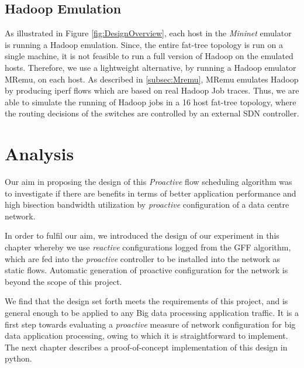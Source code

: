\subsection{Hadoop Emulation}

As illustrated in Figure \ref{fig:DesignOverview}, each host in the \textit{Mininet} emulator is running a Hadoop emulation. Since, the entire fat-tree topology is run on a single machine, it is not feasible to run a full version of Hadoop \cite{HadoopWeb} on the emulated hosts. Therefore, we use a lightweight alternative, by running a Hadoop emulator MRemu, on each host. As described in \ref{subsec:Mremu}, MRemu emulates Hadoop by producing iperf flows which are based on real Hadoop Job traces. Thus, we are able to simulate the running of Hadoop jobs in a 16 host fat-tree topology, where the routing decisions of the switches are controlled by an external SDN controller.   

\section{Analysis} \label{sec:DesignAnalysis}

Our aim in proposing the design of this \textit{Proactive} flow scheduling algorithm was to investigate if there are benefits in terms of better application performance and high bisection bandwidth utilization by \textit{proactive} configuration of a data centre network. 

In order to fulfil our aim, we introduced the design of our experiment in this chapter whereby we use \textit{reactive} configurations logged from the GFF algorithm, which are fed into the \textit{proactive} controller to be installed into the network as static flows. Automatic generation of proactive configuration for the network is beyond the scope of this project.

We find that the design set forth meets the requirements of this project, and is general enough to be applied to any Big data processing application traffic. It is a first step towards evaluating a \textit{proactive} measure of network configuration for big data application processing, owing to which it is straightforward to implement. The next chapter describes a proof-of-concept implementation of this design in python. 